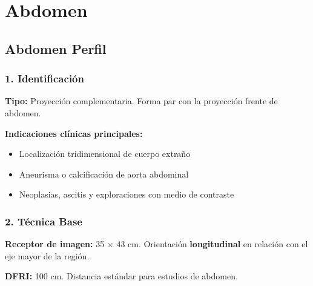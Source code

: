 	\twocolumn

\clearpage

	
	
	
	
	\section{Abdomen}
	
	\subsection{Abdomen Perfil}
	
	\subsubsection*{1. Identificación}
	
	\textbf{Tipo:} Proyección complementaria. Forma par con la proyección frente de abdomen.
	
	\textbf{Indicaciones clínicas principales:}
	\begin{itemize}
		\item Localización tridimensional de cuerpo extraño
		\item Aneurisma o calcificación de aorta abdominal
		\item Neoplasias, ascitis y exploraciones con medio de contraste
	\end{itemize}
	
	\subsubsection*{2. Técnica Base}
	
	\textbf{Receptor de imagen:} 35 $\times$ 43 cm. Orientación \textbf{longitudinal} en relación con el eje mayor de la región.
	
	\textbf{DFRI:} 100 cm. Distancia estándar para estudios de abdomen.
	
